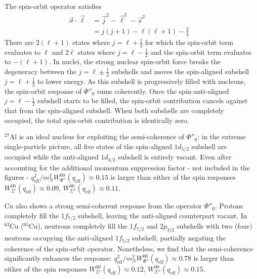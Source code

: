 \documentclass{book}[letterpaper,12pt]
\begin{document}
The spin-orbit operator satisfies
\begin{equation}
\begin{split}
\vec{\sigma}\cdot\vec{\ell}&=\vec{j}^2-\vec{\ell}^2-\vec{s}^2\\
&=j(j+1)-\ell(\ell+1)-\frac{3}{4}
\end{split}
\end{equation}
There are $2(\ell+1)$ states where $j=\ell+\frac{1}{2}$ for which the spin-orbit term evaluates to $\ell$ and $2\ell$ states where $j=\ell-\frac{1}{2}$ and the spin-orbit term evaluates to $-(\ell+1)$. In nuclei, the strong nuclear spin-orbit force breaks the degeneracy between the $j=\ell\pm\frac{1}{2}$ subshells and moves the spin-aligned subshell $j=\ell+\frac{1}{2}$ to lower energy. As this subshell is progressively filled with nucleons, the spin-orbit response of $\Phi''_{0}$ sums coherently. Once the spin-anti-aligned $j=\ell-\frac{1}{2}$ subshell starts to be filled, the spin-orbit contribution cancels against that from the spin-aligned subshell. When both subshells are completely occupied, the total spin-orbit contribution is identically zero.

$^{27}$Al is an ideal nucleus for exploiting the semi-coherence of $\Phi''_{0}$: in the extreme single-particle picture, all five states of the spin-aligned $1d_{5/2}$ subshell are occupied while the anti-aligned $1d_{3/2}$ subshell is entirely vacant. Even after accounting for the additional momentum suppression factor  - not included in the figures - $q_\mathrm{eff}^2/m_N^2W_{\Phi''}^{00}(q_\mathrm{eff})\approx 0.15$ is larger than either of the spin responses $W_{\Sigma'}^{00}(q_\mathrm{eff})\approx 0.09$, $W_{\Sigma''}^{00}(q_\mathrm{eff})\approx 0.11$. 

Cu also shows a strong semi-coherent response from the operator $\Phi''_0$. Protons completely fill the $1f_{7/2}$ subshell, leaving the anti-aligned counterpart vacant. In $^{63}$Cu ($^{65}$Cu), neutrons completely fill the $1f_{7/2}$ and $2p_{3/2}$ subshells with two (four) neutrons occupying the anti-aligned $1f_{5/2}$ subshell, partially negating the coherence of the spin-orbit operator.  Nonetheless, we find that the semi-coherence significantly enhances the response: $q_\mathrm{eff}^2/m_N^2W_{\Phi''}^{00}(q_\mathrm{eff})\approx 0.78$ is larger than either of the spin responses $W_{\Sigma'}^{00}(q_\mathrm{eff})\approx 0.12$, $W_{\Sigma''}^{00}(q_\mathrm{eff})\approx 0.15$. 
\end{document}
